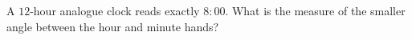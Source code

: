 A $12$-hour analogue clock reads exactly $8\!:\!00$. What is the measure of the smaller angle between the hour and minute hands?
